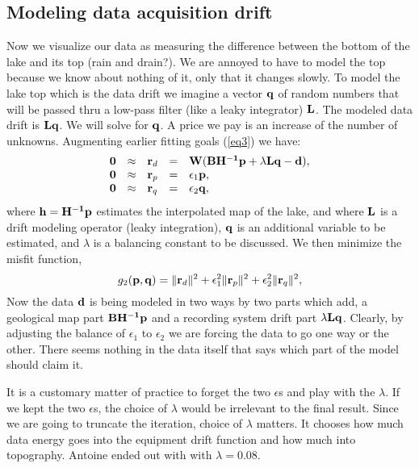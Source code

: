 \subsection{Modeling data acquisition drift}

Now we visualize our data as measuring the difference between the
bottom of the lake and its top (rain and drain?).
We are annoyed to have to model the top because we know about nothing of it,
only that it changes slowly.
To model the lake top which is the data drift
we imagine a vector $\bold q$ of random numbers
that will be passed thru a low-pass filter (like a leaky integrator) $\bold L$.
The modeled data drift is $\bold L\bold q$.
We will solve for $\bold q$.
A price we pay is an increase of the number of unknowns.
Augmenting earlier fitting goals
(\ref{eq3}) we have:
\begin{equation}
  \begin{array}{lllll}
    \bold 0 &\approx& \bold r_d &=& \bold W ( \bold B \bold {H^{-1}} \bold p + \lambda
    \bold L \bold q - \bold d
    ),\\
    \bold 0 &\approx& \bold r_p &=& \epsilon_1 \bold p ,\\
    \bold 0 &\approx& \bold r_q &=& \epsilon_2 \bold q,
  \end{array} \label{eqn:eq4}
\end{equation}
where ${\bf h}={\bf H^{-1}p}$ estimates the interpolated map of the lake, and
where ${\bf L}$ is a drift modeling operator (leaky integration),
${\bf q}$ is an additional variable to be estimated,
and $\lambda$ is a balancing constant to be discussed.
We then minimize the misfit function,
\begin{equation}
  g_2(\bold p,\bold q) = \|\bold r_d\|^2+\epsilon_1^2\|\bold r_p\|^2+\epsilon_2^2\|\bold r_q\|^2,
\end{equation}
Now the data $\bold d$ is being modeled in two ways
by two parts which add,
a geological map part $\bold B \bold {H^{-1}} \bold p$
and a recording system drift part $\lambda\bold L \bold q$.
Clearly, by adjusting the balance of
$\epsilon_1$ to
$\epsilon_2$ we are forcing the data to go one way or the other.
There seems nothing in the data itself that says which part of
the model should claim it.


\par
It is a customary matter of practice to forget the two $\epsilon$s
and play with the $\lambda$.
If we kept the two $\epsilon$s,
the choice of $\lambda$ would be irrelevant to the final result.
Since we are going to truncate the iteration,
choice of $\lambda$ matters.
It chooses how much data energy goes into the equipment drift function
and how much into topography.
Antoine ended out with with $\lambda=0.08$.

